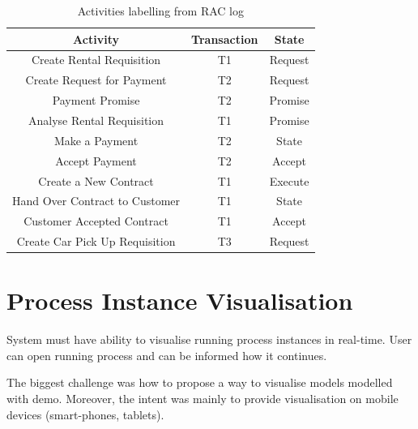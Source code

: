 \begin{table}[ht!]
\begin{tabular}{ | c | c | c | }
\hline
	\textbf{Activity} & \textbf{Transaction} & \textbf{State} \\ \hline
	Create Rental  Requisition & T1 & Request \\ \hline
	Create Request for Payment & T2 & Request \\ \hline
	Payment Promise & T2 & Promise \\ \hline
	Analyse Rental Requisition & T1 & Promise \\ \hline
	Make a Payment & T2 & State \\ \hline
	Accept Payment & T2 & Accept \\ \hline
	Create a New Contract & T1 & Execute \\ \hline
	Hand Over Contract to Customer & T1 & State \\ \hline
	Customer Accepted Contract & T1 & Accept \\ \hline
	Create Car Pick Up  Requisition & T3 & Request \\ \hline
\end{tabular}
\caption{Activities labelling from RAC log}
\label{tab:rac-log-labelling}
\end{table}
\newpage

\section{Process Instance Visualisation}
System must have ability to visualise running process instances in real-time. User can open running process and can be informed how it continues. 

The biggest challenge was how to propose a way to visualise models modelled with \gls{demo}. Moreover, the intent was mainly to provide visualisation on mobile devices (smart-phones, tablets).


